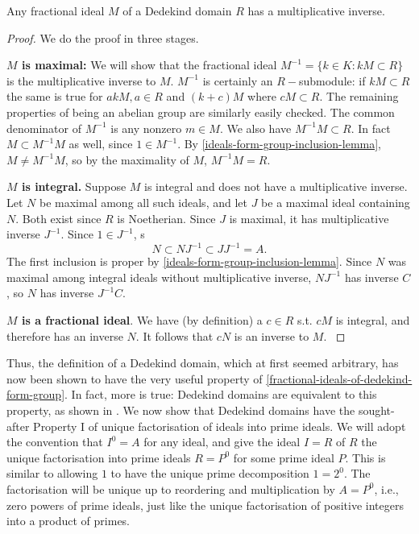 \begin{lemma}\label{fractional-ideals-of-dedekind-form-group}
Any fractional ideal $M$ of a Dedekind domain $R$ has a multiplicative inverse.
\end{lemma}
\begin{proof}
We do the proof in three stages.

\textbf{$M$ is maximal:} We will show that the fractional ideal $M^{-1}=\{k\in K: kM\subset R\}$ is the multiplicative inverse to $M$. $M^{-1}$ is certainly an $R-$submodule: if $kM\subset R$ the same is true for $akM, a\in R$ and $(k+c)M$ where $cM\subset R$. The remaining properties of being an abelian group are similarly easily checked. The common denominator of $M^{-1}$ is any nonzero $m\in M$. We also have $M^{-1}M\subset R$. In fact $M\subset M^{-1}M$ as well, since $1\in M^{-1}$. By \cref{ideals-form-group-inclusion-lemma}, $M\neq M^{-1}M$, so by the maximality of $M$, $M^{-1}M=R$. 

\textbf{$M$ is integral.} Suppose $M$ is integral and does not have a multiplicative inverse. Let $N$ be maximal among all such ideals, and let $J$ be a maximal ideal containing $N$. Both exist since $R$ is Noetherian. Since $J$ is maximal, it has multiplicative inverse $J^{-1}$. Since $1\in J^{-1}$, s $$N\subset NJ^{-1}\subset JJ^{-1}=A.$$ The first inclusion is proper by \cref{ideals-form-group-inclusion-lemma}. Since $N$ was maximal among integral ideals without multiplicative inverse, $NJ^{-1}$ has inverse $C$, so $N$ has inverse $J^{-1}C$.

\textbf{$M$ is a fractional ideal}. We have (by definition) a $c\in R$ s.t. $cM$ is integral, and therefore has an inverse $N$. It follows that $cN$ is an inverse to $M$. \cite{Wright}
\end{proof}

Thus, the definition of a Dedekind domain, which at first seemed arbitrary, has now been shown to have the very useful property of 
\cref{fractional-ideals-of-dedekind-form-group}. In fact, more is true: Dedekind domains are equivalent to this property, as shown in \cite{Wright}. We now show that Dedekind domains have the sought-after Property I of unique factorisation of ideals into prime ideals. We will adopt the convention that $I^0=A$ for any ideal, and give the ideal $I=R$ of $R$ the unique factorisation into prime ideals $R=P^0$ for some prime ideal $P$. This is similar to allowing $1$ to have the unique prime decomposition $1=2^0$. The factorisation will be unique up to reordering and multiplication by $A=P^0$, i.e., zero powers of prime ideals, just like the unique factorisation of positive integers into a product of primes.

